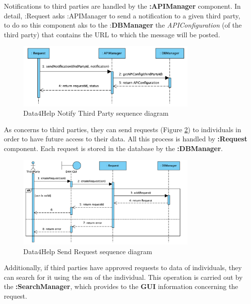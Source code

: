 \documentclass[a4paper, hidelinks, 12pt]{report}
\begin{document}
	Notifications to third parties are handled by the \textbf{:APIManager} component. In detail, :Request asks :APIManager to send a notification to a given third party, to do so this component aks to the :\textbf{DBManager} the \textit{APIConfiguration} (of the third party) that contains the URL to which the message will be posted. \\
	
	\begin{figure}[H]
		\centering
		\includegraphics[width=0.8\textwidth]{diagrams/sequence_diagrams/d4h_notify_third_party.png}
		\caption[Data4Help Notify Third Party sequence diagram]{Data4Help Notify Third Party sequence diagram}
		\label{fig:d4h_seq_ notify_third_party}
	\end{figure}
	
	As concerns to third parties, they can send requests (Figure \ref{fig:d4h_seq_send_request}) to individuals in order to have future access to their data. All this process is handled by \textbf{:Request} component. Each request is stored in the database by the \textbf{:DBManager}. \\
	
	\begin{figure}[H]
		\centering
		\includegraphics[width=0.8\textwidth]{diagrams/sequence_diagrams/d4h_send_request.png}
		\caption[Data4Help Send Request sequence diagram]{Data4Help Send Request sequence diagram}
		\label{fig:d4h_seq_send_request}
	\end{figure}
	
	Additionally, if third parties have approved requests to data of individuals, they can search for it using the ssn of the individual. This operation is carried out by the \textbf{:SearchManager}, which provides to the \textbf{GUI} information concerning the request. \\
	
\end{document}
